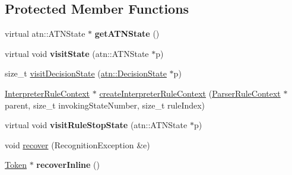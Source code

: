 \subsection*{Protected Member Functions}
\begin{DoxyCompactItemize}
\item 
\mbox{\label{classantlr4_1_1ParserInterpreter_af8d466e659e6a0fa3257cbd2e553b825}} 
virtual atn\+::\+A\+T\+N\+State $\ast$ {\bfseries get\+A\+T\+N\+State} ()
\item 
\mbox{\label{classantlr4_1_1ParserInterpreter_a266e656481c12b349e82d874df829a2f}} 
virtual void {\bfseries visit\+State} (atn\+::\+A\+T\+N\+State $\ast$p)
\item 
size\+\_\+t \hyperlink{classantlr4_1_1ParserInterpreter_a61520ac161a5ad617c73885ad18956dd}{visit\+Decision\+State} (\hyperlink{classantlr4_1_1atn_1_1DecisionState}{atn\+::\+Decision\+State} $\ast$p)
\item 
\hyperlink{classantlr4_1_1InterpreterRuleContext}{Interpreter\+Rule\+Context} $\ast$ \hyperlink{classantlr4_1_1ParserInterpreter_a0ca4deabd05eb912676a73827edc83a1}{create\+Interpreter\+Rule\+Context} (\hyperlink{classantlr4_1_1ParserRuleContext}{Parser\+Rule\+Context} $\ast$parent, size\+\_\+t invoking\+State\+Number, size\+\_\+t rule\+Index)
\item 
\mbox{\label{classantlr4_1_1ParserInterpreter_ab81fb46675112d434449dc40b3a2fa1e}} 
virtual void {\bfseries visit\+Rule\+Stop\+State} (atn\+::\+A\+T\+N\+State $\ast$p)
\item 
void \hyperlink{classantlr4_1_1ParserInterpreter_af76ec70c5be8d476a610b0cb85d2e696}{recover} (Recognition\+Exception \&e)
\item 
\mbox{\label{classantlr4_1_1ParserInterpreter_afb4052f60c5bd70bfd0e533f4edb92c9}} 
\hyperlink{classantlr4_1_1Token}{Token} $\ast$ {\bfseries recover\+Inline} ()
\end{DoxyCompactItemize}
